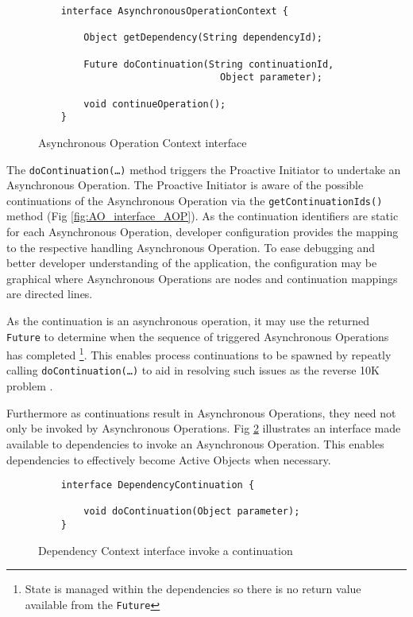 \documentclass{article}
\begin{document}
\begin{figure}[!t]
\begin{verbatim}
    interface AsynchronousOperationContext {
    
        Object getDependency(String dependencyId);
        
        Future doContinuation(String continuationId, 
                                Object parameter);
        
        void continueOperation();
    }
\end{verbatim}
\caption[Caption for Code]{Asynchronous Operation Context interface \footnotemark}
\label{fig:AOC_interface}
\end{figure}

The \texttt{doContinuation(\ldots)} method triggers the Proactive Initiator to
undertake an Asynchronous Operation.  The Proactive Initiator is aware of the
possible continuations of the Asynchronous Operation via the
\texttt{getContinuationIds()} method (Fig \ref{fig:AO_interface_AOP}).  As the
continuation identifiers are static for each Asynchronous Operation, developer
configuration provides the mapping to the respective handling Asynchronous
Operation.  To ease debugging and better developer understanding of the
application, the configuration may be graphical where Asynchronous Operations
are nodes and continuation mappings are directed lines.

As the continuation is an asynchronous operation, it may use the returned
\texttt{Future} to determine when the sequence of triggered Asynchronous
Operations has completed \footnote{State is managed within the dependencies so
there is no return value available from the \texttt{Future}}.  This enables
process continuations \cite{process-continuation} to be spawned by repeatly
calling \texttt{doContinuation(\ldots)} to aid in resolving such issues as the
reverse 10K problem \cite{reverse-ten-k-problem}.

Furthermore as continuations result in Asynchronous Operations, they need not
only be invoked by Asynchronous Operations. Fig \ref{fig:DC_interface}
illustrates an interface made available to dependencies to invoke an
Asynchronous Operation.  This enables dependencies to effectively become Active
Objects \cite{active-object} when necessary.

\begin{figure}[!t]
\begin{verbatim}
    interface DependencyContinuation {
            
        void doContinuation(Object parameter);
    }
\end{verbatim}
\caption[Caption for Code]{Dependency Context interface invoke a continuation}
\label{fig:DC_interface}
\end{figure}
\end{document}
